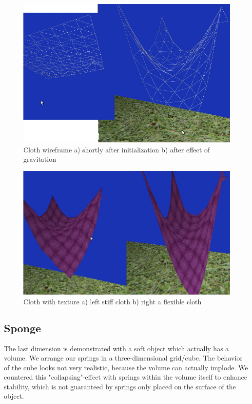 \documentclass[11pt]{article}
\begin{document}
\begin{figure}[h]
\centering
\includegraphics[scale=0.3]{cloth-grid.jpg}
\caption{Cloth wireframe a) shortly after initialization b) after effect of gravitation}
\label{fig:cloth-grid}
\end{figure}

\begin{figure}[h]
\centering
\includegraphics[scale=0.3]{cloth-stiffness.jpg}
\caption{Cloth with texture a) left stiff cloth b) right a flexible cloth}
\label{fig:cloth-stif}
\end{figure}


\subsection{Sponge}
The last dimension is demonstrated with a soft object which actually has a volume. We arrange our springs in a three-dimensional grid/cube. The behavior of the cube looks not very realistic, because the volume can actually implode. We countered this "collapsing"-effect with springs within the volume itself to enhance stability, which is not guaranteed by springs only placed on the surface of the object.
\end{document}
